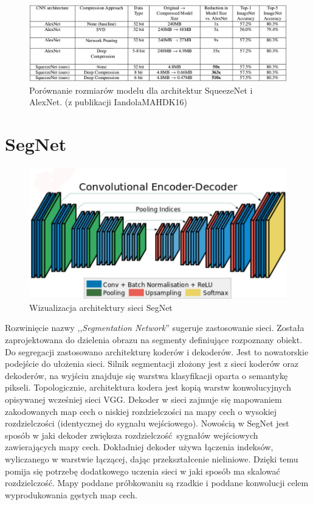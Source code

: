 \documentclass[12pt,a4paper,twoside,titlepage,openright]{book}
\begin{document}
\begin{itemize}
\begin{itemize}
\begin{figure}[ht]
	\centering
			\includegraphics[resolution=100, scale=0.55]{squeezeNetCompression.png}
		\caption{Porównanie rozmiarów modelu dla architektur SqueezeNet i AlexNet. (z publikacji IandolaMAHDK16)}
\end{figure}

\section{SegNet}
\begin{figure}[ht]
	\centering
			\includegraphics[resolution=100, scale=0.4]{SegNet.png}
		\caption{Wizualizacja architektury sieci SegNet}
\end{figure}
Rozwinięcie nazwy ,,\textit{Segmentation Network}'' sugeruje zastosowanie sieci. Została zaprojektowana do dzielenia obrazu na segmenty definiujące rozpoznany obiekt. Do segregacji zastosowano architekturę koderów i dekoderów. Jest to nowatorskie podejście do ułożenia sieci. Silnik segmentacji złożony jest z sieci koderów oraz dekoderów, na wyjściu znajduje się warstwa klasyfikacji oparta o semantykę pikseli. Topologicznie, architektura kodera jest kopią warstw konwolucyjnych opisywanej wcześniej sieci VGG. Dekoder w sieci zajmuje się mapowaniem zakodowanych map cech o niskiej rozdzielczości na mapy cech o wysokiej rozdzielczości (identycznej do sygnału wejściowego). Nowością w SegNet jest sposób w jaki dekoder zwiększa rozdzielczość sygnałów wejściowych zawierających mapy cech. Dokładniej dekoder używa łączenia indeksów, wyliczanego w warstwie łączącej, dając przekształcenie nieliniowe. Dzięki temu pomija się potrzebę dodatkowego uczenia sieci w jaki sposób ma skalować rozdzielczość. Mapy poddane próbkowaniu są rzadkie i poddane konwolucji celem wyprodukowania gęstych map cech.


\end{itemize}
\end{itemize}
\end{document}
